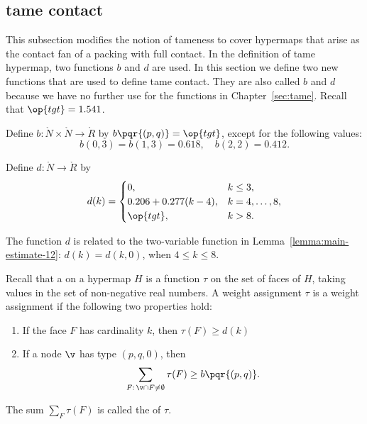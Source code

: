 \subsection{tame contact}

This subsection modifies the notion of tameness to cover hypermaps
that arise as the contact fan of a packing with full contact.  In the
definition of tame hypermap, two functions $b$ and $d$ are used.  In
this section we define two new functions that are used to define tame
contact.  They are also  called $b$ and $d$ because we have no
further use for the functions in Chapter~\ref{sec:tame}.  
Recall that $\op{tgt}=1.541$.
%
%

\begin{definition}[b]
  Define $b:\ring{N}\times \ring{N}\to \ring{R}$ by
  $b\pqr{(p,q)}=\op{tgt}$, except for the following values:
\[
b(0,3)=b(1,3)=0.618,\quad b(2,2)=0.412.
\]
\end{definition}
%

\begin{definition}[d]
Define $d:\ring{N}\to \ring{R}$ by
\[d(k) = \begin{cases}
0, & k\le 3, \\
0.206 + 0.277 (k-4),& k=4,\ldots,8,\\
\op{tgt},& k>8.\\
\end{cases}
\]
\end{definition}
%

The function $d$ is related to the two-variable function in
Lemma~\ref{lemma:main-estimate-12}: $d(k) = d(k,0)$, when $4\le k\le
8$.

\begin{definition}
%
  Recall that a  on a hypermap $H$ is a
  function $\tau$ on the set of faces of $H$, taking values in the set
  of non-negative real numbers. A weight assignment $\tau$
is a 
  weight assignment if the following two properties hold:
%
\begin{enumerate}
\item If the face $F$ has cardinality $k$, then
$\tau(F) \ge d(k)$
\item If a node $\v$ has type $(p,q,0)$, then
  \[\sum_{F:\,\v\cap F\ne\emptyset} \tau(F) \ge
    b{\pqr{(p,q)}}.\]
\end{enumerate}
The sum $\sum_F \tau(F)$ is called the  of $\tau$.
%
\end{definition}


